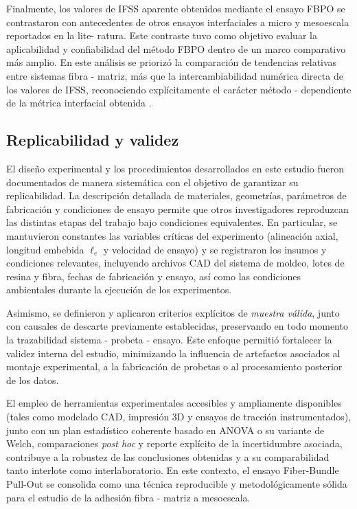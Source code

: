 Finalmente, los valores de IFSS aparente obtenidos mediante el ensayo FBPO se contrastaron con
antecedentes de otros ensayos interfaciales a micro y mesoescala reportados en la lite- ratura.
Este contraste tuvo como objetivo evaluar la aplicabilidad y confiabilidad del método FBPO
dentro de un marco comparativo más amplio. En este análisis se priorizó la comparación de
tendencias relativas entre sistemas fibra - matriz, más que la intercambiabilidad numérica
directa de los valores de IFSS, reconociendo explícitamente el carácter método - dependiente
de la métrica interfacial obtenida \cite{Fischer2020, Liu2021, DeLeon2022}.

\subsection{Replicabilidad y validez}

El diseño experimental y los procedimientos desarrollados en este estudio fueron documentados
de manera sistemática con el objetivo de garantizar su replicabilidad. La descripción detallada
de materiales, geometrías, parámetros de fabricación y condiciones de ensayo permite que otros
investigadores reproduzcan las distintas etapas del trabajo bajo condiciones equivalentes.
En particular, se mantuvieron constantes las variables críticas del experimento (alineación
axial, longitud embebida \(\ell_e\) y velocidad de ensayo) y se registraron los insumos y
condiciones relevantes, incluyendo archivos CAD del sistema de moldeo, lotes de resina y fibra,
fechas de fabricación y ensayo, así como las condiciones ambientales durante la ejecución de
los experimentos.

Asimismo, se definieron y aplicaron criterios explícitos de \emph{muestra válida}, junto con
causales de descarte previamente establecidas, preservando en todo momento la trazabilidad
sistema - probeta - ensayo. Este enfoque permitió fortalecer la validez interna del estudio,
minimizando la influencia de artefactos asociados al montaje experimental, a la fabricación de
probetas o al procesamiento posterior de los datos.

El empleo de herramientas experimentales accesibles y ampliamente disponibles (tales como
modelado CAD, impresión 3D y ensayos de tracción instrumentados), junto con un plan estadístico
coherente basado en ANOVA o su variante de Welch, comparaciones \emph{post hoc} y reporte
explícito de la incertidumbre asociada, contribuye a la robustez de las conclusiones obtenidas
y a su comparabilidad tanto interlote como interlaboratorio. En este contexto, el ensayo
Fiber-Bundle Pull-Out se consolida como una técnica reproducible y metodológicamente sólida
para el estudio de la adhesión fibra - matriz a mesoescala.